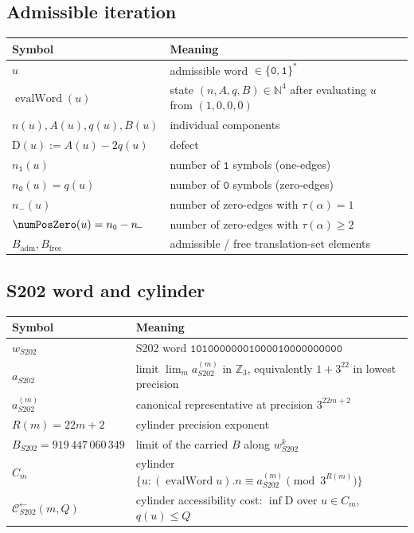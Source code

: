 \documentclass[11pt,a4paper]{article}
\theoremstyle{plain}
\theoremstyle{definition}
\newcommand{\NN}{\mathbb{N}}
\newcommand{\Zp}[1]{\mathbb{Z}_{#1}}
\newcommand{\aS}{a_{S202}}
\newcommand{\aSat}{a_{S202}^{(m)}}
\newcommand{\wS}{w_{S202}}
\newcommand{\defect}{\mathrm{D}}
\newcommand{\Cback}{\mathcal{C}^{\!\leftarrow}_{S202}}
\newcommand{\numOnes}{n_{\mathtt{1}}}
\newcommand{\numNeg}{n_{\!-}}
\newcommand{\numZeros}{n_{\mathtt{0}}}
\DeclareMathOperator{\evalWord}{evalWord}
\begin{document}
\subsection*{Admissible iteration}

\begin{center}\footnotesize
\begin{tabular}{ll}
\toprule
Symbol & Meaning \\
\midrule
$u$ & admissible word $\in \{\mathtt{0}, \mathtt{1}\}^*$ \\
$\evalWord(u)$ & state $(n, A, q, B) \in \NN^4$ after evaluating $u$ from $(1, 0, 0, 0)$ \\
$n(u), A(u), q(u), B(u)$ & individual components \\
$\defect(u) := A(u) - 2 q(u)$ & defect \\
$\numOnes(u)$ & number of $\mathtt{1}$ symbols (one-edges) \\
$\numZeros(u) = q(u)$ & number of $\mathtt{0}$ symbols (zero-edges) \\
$\numNeg(u)$ & number of zero-edges with $\tau(\alpha) = 1$ \\
$\numPosZero(u) = \numZeros - \numNeg$ & number of zero-edges with $\tau(\alpha) \ge 2$ \\
$B_{\mathrm{adm}}, B_{\mathrm{free}}$ & admissible / free translation-set elements \\
\bottomrule
\end{tabular}
\end{center}

\subsection*{S202 word and cylinder}

\begin{center}\footnotesize
\begin{tabular}{ll}
\toprule
Symbol & Meaning \\
\midrule
$\wS$ & S202 word $\mathtt{10100000001000010000000000}$ \\
$\aS$ & limit $\lim_m \aSat$ in $\Zp{3}$, equivalently $1 + 3^{22}$ in lowest precision \\
$\aSat$ & canonical representative at precision $3^{22m+2}$ \\
$R(m) = 22m + 2$ & cylinder precision exponent \\
$B_{S202} = 919\,447\,060\,349$ & limit of the carried $B$ along $\wS^k$ \\
$C_m$ & cylinder $\{u : (\evalWord u).n \equiv \aSat \pmod{3^{R(m)}}\}$ \\
$\Cback(m, Q)$ & cylinder accessibility cost: $\inf \defect$ over $u \in C_m$, $q(u) \le Q$ \\
\bottomrule
\end{tabular}
\end{center}
\end{document}
